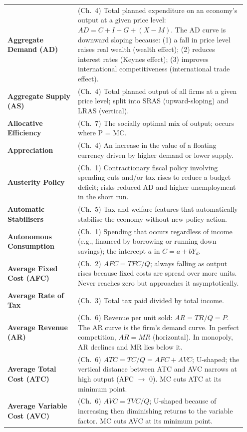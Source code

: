 \documentclass[11pt, a4paper, twoside]{book}
\begin{document}
\begin{longtable}{@{}>{\RaggedRight\arraybackslash}p{0.28\linewidth}>{\RaggedRight\arraybackslash}p{0.67\linewidth}@{}}
\textbf{Aggregate Demand (AD)} & (Ch.~4) Total planned expenditure on an economy's output at a given price level: $AD = C + I + G + (X-M)$. The AD curve is downward sloping because: (1) a fall in price level raises real wealth (wealth effect); (2) reduces interest rates (Keynes effect); (3) improves international competitiveness (international trade effect). \\
\textbf{Aggregate Supply (AS)} & (Ch.~4) Total planned output of all firms at a given price level; split into SRAS (upward-sloping) and LRAS (vertical). \\
\textbf{Allocative Efficiency} & (Ch.~7) The socially optimal mix of output; occurs where P = MC. \\
\textbf{Appreciation} & (Ch.~4) An increase in the value of a floating currency driven by higher demand or lower supply. \\
\textbf{Austerity Policy} & (Ch.~1) Contractionary fiscal policy involving spending cuts and/or tax rises to reduce a budget deficit; risks reduced AD and higher unemployment in the short run. \\
\textbf{Automatic Stabilisers} & (Ch.~5) Tax and welfare features that automatically stabilise the economy without new policy action. \\
\textbf{Autonomous Consumption} & (Ch.~1) Spending that occurs regardless of income (e.g., financed by borrowing or running down savings); the intercept $a$ in $C = a + bY_d$. \\
\textbf{Average Fixed Cost (AFC)} & (Ch.~2) $AFC = TFC / Q$; always falling as output rises because fixed costs are spread over more units. Never reaches zero but approaches it asymptotically. \\
\textbf{Average Rate of Tax} & (Ch.~3) Total tax paid divided by total income. \\
\textbf{Average Revenue (AR)} & (Ch.~6) Revenue per unit sold: $AR = TR/Q = P$. The AR curve is the firm's demand curve. In perfect competition, $AR = MR$ (horizontal). In monopoly, AR declines and MR lies below it. \\
\textbf{Average Total Cost (ATC)} & (Ch.~6) $ATC = TC / Q = AFC + AVC$; U-shaped; the vertical distance between ATC and AVC narrows at high output (AFC $\rightarrow$ 0). MC cuts ATC at its minimum point. \\
\textbf{Average Variable Cost (AVC)} & (Ch.~6) $AVC = TVC / Q$; U-shaped because of increasing then diminishing returns to the variable factor. MC cuts AVC at its minimum point. \\


\end{longtable}
\end{document}
